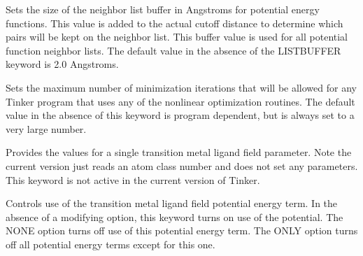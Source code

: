 \documentclass[letterpaper,11pt,english]{sphinxmanual}
\begin{document}
\ignorespaces {}\label{\detokenize{text/keywords:key-list-buffer}}\begin{description}
\sphinxAtStartPar
Sets the size of the neighbor list buffer in Angstroms for potential energy functions. This value is added to the actual cutoff distance to determine which pairs will be kept on the neighbor list. This buffer value is used for all potential function neighbor lists. The default value in the absence of the LIST\sphinxhyphen{}BUFFER keyword is 2.0 Angstroms.

\end{description}

\ignorespaces {}\label{\detokenize{text/keywords:key-maxiter}}\begin{description}
\sphinxAtStartPar
Sets the maximum number of minimization iterations that will be allowed for any Tinker program that uses any of the nonlinear optimization routines. The default value in the absence of this keyword is program dependent, but is always set to a very large number.

\end{description}

\ignorespaces {}\label{\detokenize{text/keywords:key-metal}}\begin{description}
\sphinxAtStartPar
Provides the values for a single transition metal ligand field parameter. Note the current version just reads an atom class number and does not set any parameters. This keyword is not active in the current version of Tinker.

\end{description}

\ignorespaces {}\label{\detokenize{text/keywords:key-metalterm}}\begin{description}
\sphinxAtStartPar
Controls use of the transition metal ligand field potential energy term. In the absence of a modifying option, this keyword turns on use of the potential. The NONE option turns off use of this potential energy term. The ONLY option turns off all potential energy terms except for this one.

\end{description}
\end{document}
